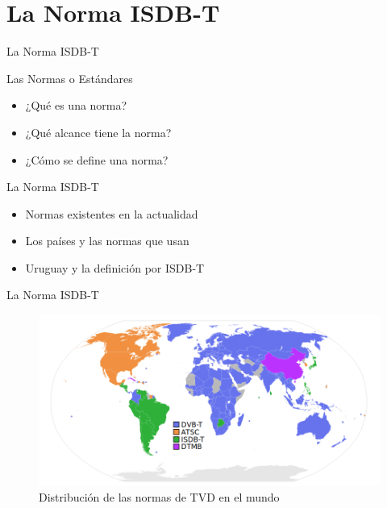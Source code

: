 \section{La Norma ISDB-T}
\begin{frame}{La Norma ISDB-T}
	\begin{block}{Las Normas o Estándares}
	\begin{itemize}
		\item {	¿Qué es una norma?}
		\item { ¿Qué alcance tiene la norma? }
		\item {	¿Cómo se define una norma?	}
	\end{itemize}
	\end{block}
	\begin{block}{La Norma ISDB-T}
	\begin{itemize}
		\item {	Normas existentes en la actualidad}
		\item { Los países y las normas que usan }
		\item {	Uruguay y la definición por ISDB-T	}
	\end{itemize}
	\end{block}
\end{frame}

\begin{frame}{La Norma ISDB-T}
\begin{figure}
	\includegraphics[scale=0.35]{Standards}
	\caption{Distribución de las normas de TVD en el mundo}
\end{figure}

\end{frame}

